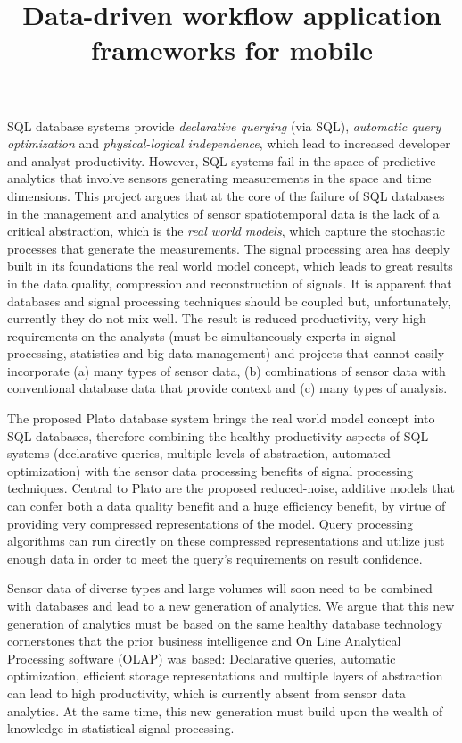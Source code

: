 \documentclass{article}
\title{Data-driven workflow application frameworks for mobile}
\renewcommand{\paragraph}[1]{{\noindent {\bf #1}}}
\begin{document}
\paragraph{Summary} SQL database systems provide {\em declarative querying} (via SQL), {\em automatic query optimization} and {\em physical-logical independence}, which lead to increased developer and analyst productivity. However, SQL systems fail in the space of predictive analytics that involve sensors generating measurements in the space and time dimensions. This project argues that at the core of the failure of SQL databases in the management and analytics of sensor spatiotemporal data is the lack of a critical abstraction, which is the {\em real world models}, which capture the stochastic processes that generate the measurements. The signal processing area has deeply built in its foundations the real world model concept, which leads to great results in the data quality, compression and reconstruction of signals. It is apparent that databases and signal processing techniques should be coupled but, unfortunately, currently they do not mix well. The result is reduced productivity, very high requirements on the analysts (must be simultaneously experts in signal processing, statistics and big data management) and projects that cannot easily incorporate (a) many types of sensor data, (b) combinations of sensor data with conventional database data that provide context and (c) many types of analysis.

The proposed Plato database system brings the real world model concept into SQL databases, therefore combining the healthy productivity aspects of SQL systems (declarative queries, multiple levels of abstraction, automated optimization) with the sensor data processing benefits of signal processing techniques. Central to Plato are the proposed reduced-noise, additive models that can confer both a data quality benefit and a huge efficiency benefit, by virtue of providing very compressed representations of the model. Query processing algorithms can run directly on these compressed representations and utilize just enough data in order to meet the query's requirements on result confidence.

Sensor data of diverse types and large volumes will soon need to be combined with databases and lead to a new generation of analytics. We argue that this new generation of analytics must be based on the same healthy database technology cornerstones that the prior business intelligence and On Line Analytical Processing software (OLAP) was based: Declarative queries, automatic optimization, efficient storage representations and multiple layers of abstraction can lead to high productivity, which is currently absent from sensor data analytics. At the same time, this new generation must build upon the wealth of knowledge in statistical signal processing. 
\end{document}

